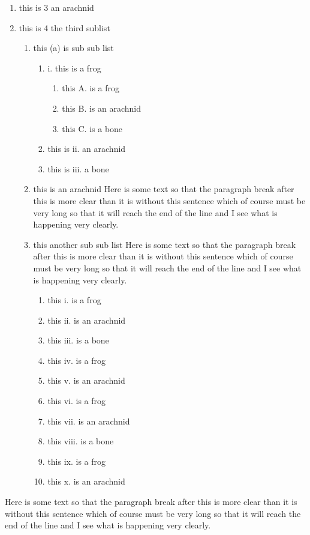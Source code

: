 ﻿\documentclass{article}
\begin{document}
\begin{enumerate}
\begin{itemize}
   \item this another sub sub list. filler filler filler filler filler filler filler filler filler filler filler filler filler filler filler filler filler filler filler filler filler filler filler filler filler 
      \begin{enumerate}
      \item this is 2 (a) frog
      \item this is 2 (b) an arachnid
      \item this is 2 (c) bone
      \end{enumerate}
   \end{itemize}
\item this is 3 an arachnid
\item this is 4 the third sublist
   \begin{enumerate}
   \item this (a) is sub sub list
      \begin{enumerate}
      \item  i. this is a frog
          \begin{enumerate}
          \item this A. is a frog
          \item this B. is an arachnid
          \item this C. is a bone
          \end{enumerate}
      \item this is ii. an arachnid
      \item this is iii. a bone
      \end{enumerate}
   \item this is an arachnid Here is some text so that the paragraph break after this
is more clear than it is without this sentence which of
course must be very long so that it will reach the end of
the line and I see what is happening very clearly.

   \item this another sub sub list Here is some text so that the paragraph break after this
is more clear than it is without this sentence which of
course must be very long so that it will reach the end of
the line and I see what is happening very clearly.

      \begin{enumerate}
      \item this i. is a frog
      \item this ii. is an arachnid
      \item this iii. is a bone
      \item this iv. is a frog
      \item this v. is an arachnid
      \item this vi. is a frog
      \item this vii. is an arachnid
      \item this viii. is a bone
      \item this ix. is a frog
      \item this x. is an arachnid
      \end{enumerate}
   \end{enumerate}
\end{enumerate}
Here is some text so that the paragraph break after this
is more clear than it is without this sentence which of
course must be very long so that it will reach the end of
the line and I see what is happening very clearly.
\end{document}
